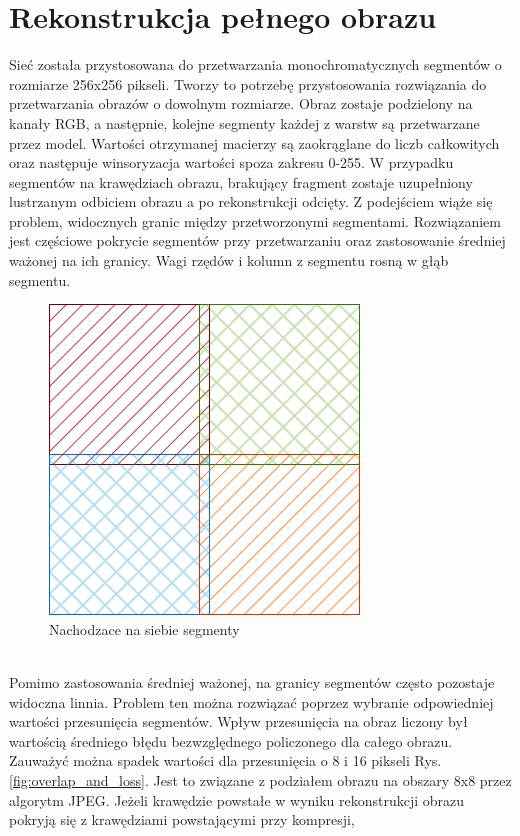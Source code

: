 \documentclass[a4paper, 12pt]{article}
\begin{document}
\section{Rekonstrukcja pełnego obrazu}
Sieć została przystosowana do przetwarzania monochromatycznych segmentów o rozmiarze 256x256 pikseli.
Tworzy to potrzebę przystosowania rozwiązania do przetwarzania obrazów o dowolnym rozmiarze.
Obraz zostaje podzielony na kanały RGB, a następnie, kolejne segmenty każdej z warstw są przetwarzane przez model.
Wartości otrzymanej macierzy są zaokrąglane do liczb całkowitych oraz następuje winsoryzacja wartości spoza zakresu 0-255.
W przypadku segmentów na krawędziach obrazu, brakujący fragment zostaje uzupełniony lustrzanym odbiciem obrazu a po rekonstrukcji odcięty.
Z podejściem wiąże się problem, widocznych granic między przetworzonymi segmentami.
Rozwiązaniem jest częściowe pokrycie segmentów przy przetwarzaniu oraz zastosowanie średniej ważonej na ich granicy.
Wagi rzędów i kolumn z segmentu rosną w głąb segmentu.
\\
\begin{figure}[h!]
\begin{center}
	\includegraphics[width=0.5\columnwidth]{overlap.png}
	\caption{Nachodzace na siebie segmenty}
\end{center}
\end{figure}
\\
Pomimo zastosowania średniej ważonej, na granicy segmentów często pozostaje widoczna linnia.
Problem ten można rozwiązać poprzez wybranie odpowiedniej wartości przesunięcia segmentów.
Wpływ przesunięcia na obraz liczony był wartością średniego błędu bezwzględnego policzonego dla całego obrazu.
Zauważyć można spadek wartości dla przesunięcia o 8 i 16 pikseli Rys. \ref{fig:overlap_and_loss}.
Jest to związane z podziałem obrazu na obszary 8x8 przez algorytm JPEG.
Jeżeli krawędzie powstałe w wyniku rekonstrukcji obrazu pokryją się z krawędziami powstającymi przy kompresji,
\end{document}
